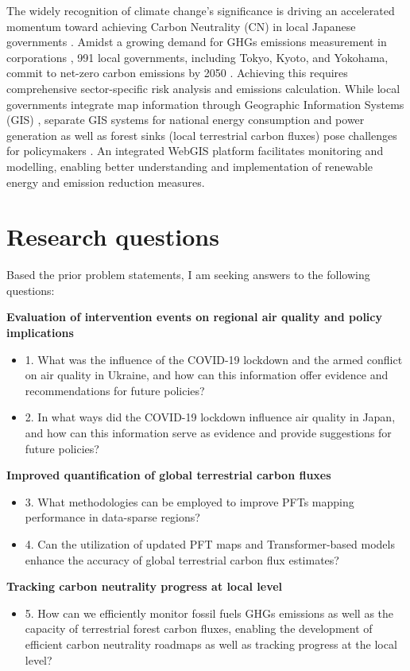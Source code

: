 The widely recognition of climate change's significance \citep{primack2009impact, watanabe2009general, ogawa2013ecological, shibuya2016effect} is driving an accelerated momentum toward achieving Carbon Neutrality (CN) in local Japanese governments \citep{nakazawa2023net}. Amidst a growing demand for GHGs emissions measurement in corporations \citep{kauffmann2012corporate}, 991 local governments, including Tokyo, Kyoto, and Yokohama, commit to net-zero carbon emissions by 2050 \citep{zerocarboncities}. Achieving this requires comprehensive sector-specific risk analysis and emissions calculation. While local governments integrate map information through Geographic Information Systems (GIS) \citep{nikkei}, separate GIS systems for national energy consumption and power generation as well as forest sinks (local terrestrial carbon fluxes) pose challenges for policymakers \citep{Toshihiko, kitamoto, nlftp}. An integrated WebGIS platform facilitates monitoring and modelling, enabling better understanding and implementation of renewable energy and emission reduction measures. \par

\section{Research questions}
Based the prior problem statements, I am seeking answers to the following questions:

\textbf{Evaluation of intervention events on regional air quality and policy implications}
\begin{itemize}
    \item 1. What was the influence of the COVID-19 lockdown and the armed conflict on air quality in Ukraine, and how can this information offer evidence and recommendations for future policies?
    \item 2. In what ways did the COVID-19 lockdown influence air quality in Japan, and how can this information serve as evidence and provide suggestions for future policies?
\end{itemize}

\textbf{Improved quantification of global terrestrial carbon fluxes}
\begin{itemize}
    \item 3. What methodologies can be employed to improve PFTs mapping performance in data-sparse regions?
    \item 4. Can the utilization of updated PFT maps and Transformer-based models enhance the accuracy of global terrestrial carbon flux estimates?
\end{itemize}
\textbf{Tracking carbon neutrality progress at local level}
\begin{itemize}
    \item 5. How can we efficiently monitor fossil fuels GHGs emissions as well as the capacity of terrestrial forest carbon fluxes, enabling the development of efficient carbon neutrality roadmaps as well as tracking progress at the local level?
\end{itemize}

